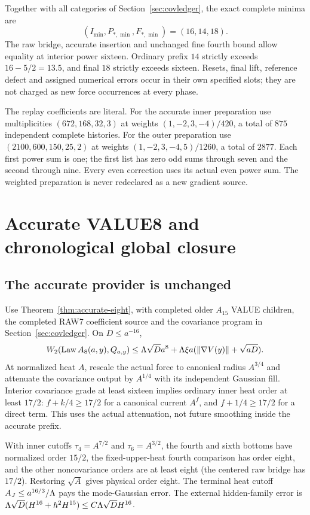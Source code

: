 \documentclass[11pt]{article}
\numberwithin{equation}{section}
\theoremstyle{remark}\newtheorem{remark}[theorem]{Remark}
\newcommand{\Law}{\operatorname{Law}}\newcommand{\Lip}{\operatorname{Lip}}
\newcommand{\norm}[1]{\lVert#1\rVert}
\begin{document}
Together with all categories of Section~\ref{sec:covledger}, the exact complete minima are
\begin{equation}\label{eq:phase-mins}
 (I_{\min},P_{*,\min},F_{*,\min})=(16,14,18).
\end{equation}
The raw bridge, accurate insertion and unchanged fine fourth bound allow equality at interior power sixteen. Ordinary prefix $14$ strictly exceeds $16-5/2=13.5$, and final $18$ strictly exceeds sixteen. Resets, final lift, reference defect and assigned numerical errors occur in their own specified slots; they are not charged as new force occurrences at every phase.

The replay coefficients are literal. For the accurate inner preparation use multiplicities $(672,168,32,3)$ at weights $(1,-2,3,-4)/420$, a total of $875$ independent complete histories. For the outer preparation use $(2100,600,150,25,2)$ at weights $(1,-2,3,-4,5)/1260$, a total of $2877$. Each first power sum is one; the first list has zero odd sums through seven and the second through nine. Every even correction uses its actual even power sum. The weighted preparation is never redeclared as a new gradient source.

\section{Accurate VALUE8 and chronological global closure}
\label{sec:global}
\subsection{The accurate provider is unchanged}
Use Theorem~\ref{thm:accurate-eight}, with completed older $A_{15}$ VALUE children, the completed RAW7 coefficient source and the covariance program in Section~\ref{sec:covledger}. On $D\le a^{-16}$,
\[
 W_2(\Law A_8(a,y),Q_{a,y})
 \le\LL\sqrt D a^8+\LL\xi a(\norm{\nabla V(y)}+\sqrt{aD}).
\]
At normalized heat $A$, rescale the actual force to canonical radius $A^{3/4}$ and attenuate the covariance output by $A^{1/4}$ with its independent Gaussian fill. Interior covariance grade at least sixteen implies ordinary inner heat order at least $17/2$: $f+k/4\ge17/2$ for a canonical current $A^f$, and $f+1/4\ge17/2$ for a direct term. This uses the actual attenuation, not future smoothing inside the accurate prefix.

With inner cutoffs $\tau_4=A^{7/2}$ and $\tau_6=A^{3/2}$, the fourth and sixth bottoms have normalized order $15/2$, the fixed-upper-heat fourth comparison has order eight, and the other noncovariance orders are at least eight (the centered raw bridge has $17/2$). Restoring $\sqrt A$ gives physical order eight. The terminal heat cutoff $A_J\le a^{16/3}/\Lambda$ pays the mode-Gaussian error. The external hidden-family error is $\Lambda\sqrt D(H^{16}+h^2H^{15})\le C\Lambda\sqrt D H^{16}$.
\end{document}
